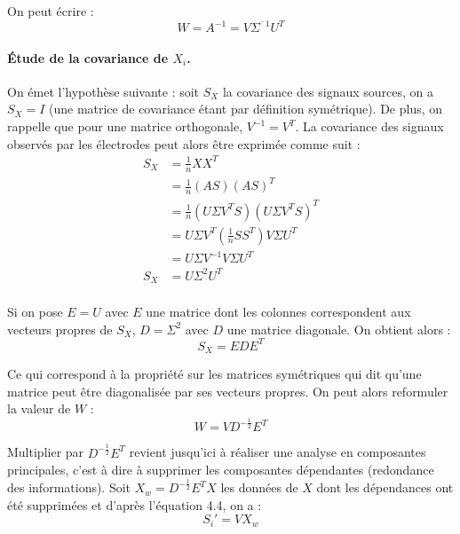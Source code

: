 On peut écrire : 
\begin{equation}
	W = A^{-1} = V \Sigma^{^-1} U^T
\end{equation}

\paragraph{Étude de la covariance de $X_i$.}
On émet l'hypothèse suivante : soit $S_X$ la covariance des signaux sources, on a $S_X = I$ (une matrice de covariance étant par définition symétrique). De plus, on rappelle que pour une matrice orthogonale, $V^{-1}=V^T$. La covariance des signaux observés par les électrodes peut alors être exprimée comme suit : 
\begin{equation}
\begin{split}
S_X &= \frac{1}{n}XX^T \\
&= \frac{1}{n}(AS)(AS)^T \\
& = \frac{1}{n}(U\Sigma V^TS)(U\Sigma V^TS)^T  \\
& = U\Sigma V^T(\frac{1}{n}SS^T)V\Sigma U^T  \\
& = U\Sigma V^{-1}V\Sigma U^T \\
S_X &=  U\Sigma^2 U^T \\
\end{split}
\end{equation}

Si on pose $E = U$ avec $E$ une matrice dont les colonnes correspondent aux vecteurs propres de $S_X$, $D = \Sigma^2$ avec $D$ une matrice diagonale. On obtient alors :
\begin{equation}
	S_X = EDE^T
\end{equation}

Ce qui correspond à la propriété sur les matrices symétriques qui dit qu'une matrice peut être diagonalisée par ses vecteurs propres. 
On peut alors reformuler la valeur de $W$ : 
\begin{equation}
	W = VD^{-\frac{1}{2}}E^T
\end{equation}

Multiplier par $D^{-\frac{1}{2}}E^T$ revient jusqu'ici à réaliser une analyse en composantes principales, c'est à dire à supprimer les composantes dépendantes (redondance des informations). Soit $X_w = D^{-\frac{1}{2}}E^TX$ les données de $X$ dont les dépendances ont été supprimées et d'après l'équation 4.4, on a :
\begin{equation}
	S_i' = VX_w
\end{equation}

